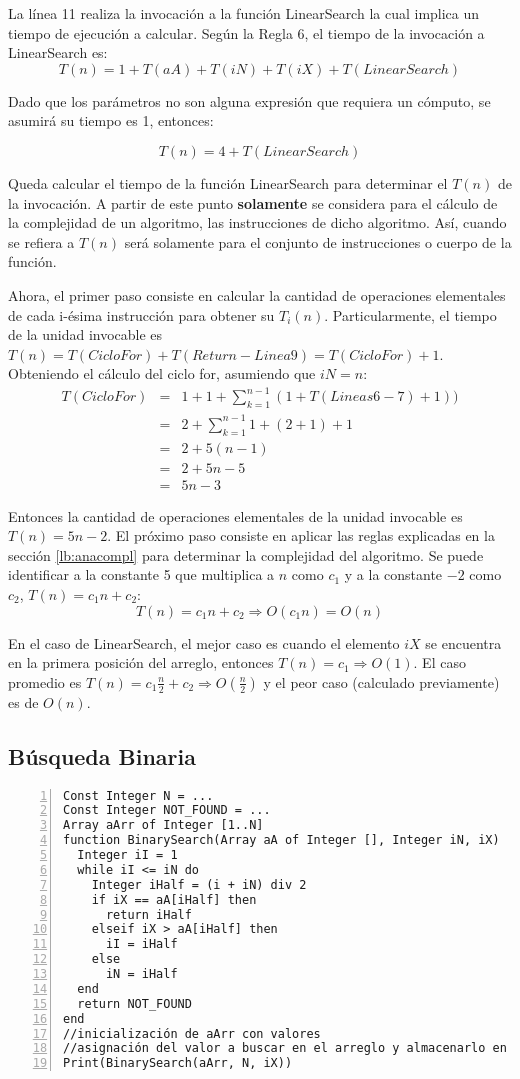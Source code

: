 La línea 11 realiza la invocación a la función LinearSearch la cual implica un tiempo de ejecución a calcular. Según la Regla 6, el tiempo de la invocación a LinearSearch es:
$$T(n) = 1 + T(aA) + T(iN) + T(iX) + T(LinearSearch)$$

Dado que los parámetros no son alguna expresión que requiera un cómputo, se asumirá su tiempo es 1, entonces:

$$T(n) = 4 + T(LinearSearch)$$

Queda calcular el tiempo de la función LinearSearch para determinar el $T(n)$ de la invocación. A partir de este punto \textbf{solamente} se considera para el cálculo de la complejidad de un algoritmo, las instrucciones de dicho algoritmo. Así, cuando se refiera a $T(n)$ será solamente para el conjunto de instrucciones o cuerpo de la función.

Ahora, el primer paso consiste en calcular la cantidad de operaciones elementales de cada i-ésima instrucción para obtener su $T_i(n)$. Particularmente, el tiempo de la unidad invocable es $T(n) = T(CicloFor) + T(Return-Linea9) = T(CicloFor) + 1$. Obteniendo el cálculo del ciclo for, asumiendo que $iN=n$:
\begin{eqnarray*}
T(CicloFor)&=&1 + 1 + \sum_{k=1}^{n - 1}{(1 + T(Lineas 6-7) + 1))}\\
&=&2 + \sum_{k=1}^{n - 1}{1 + (2 + 1) + 1}\\
&=&2 + 5(n - 1)\\
&=&2 + 5n - 5\\
&=&5n - 3
\end{eqnarray*}

Entonces la cantidad de operaciones elementales de la unidad invocable es $T(n) = 5n - 2$. El próximo paso consiste en aplicar las reglas explicadas en la sección \ref{lb:anacompl} para determinar la complejidad del algoritmo. Se puede identificar a la constante 5 que multiplica a $n$ como $c_1$ y a la constante $-2$ como $c_2$, $T(n) = c_1n + c_2$:
$$T(n) = c_1n + c_2 \Rightarrow O(c_1n) = O(n)$$

En el caso de LinearSearch, el mejor caso es cuando el elemento $iX$ se encuentra en la primera posición del arreglo, entonces $T(n) = c_1 \Rightarrow O(1)$. El caso promedio es $T(n) = c_1\frac{n}{2} + c_2 \Rightarrow O(\frac{n}{2})$ y el peor caso (calculado previamente) es de $O(n)$.

\subsection{Búsqueda Binaria}
\begin{lstlisting}[upquote=true, language=pseudo, numbers=left]
Const Integer N = ...
Const Integer NOT_FOUND = ...
Array aArr of Integer [1..N]
function BinarySearch(Array aA of Integer [], Integer iN, iX)	//iX es el elemento a buscar
  Integer iI = 1
  while iI <= iN do
    Integer iHalf = (i + iN) div 2
    if iX == aA[iHalf] then
      return iHalf
    elseif iX > aA[iHalf] then
      iI = iHalf
    else
      iN = iHalf
  end
  return NOT_FOUND
end
//inicialización de aArr con valores
//asignación del valor a buscar en el arreglo y almacenarlo en iX
Print(BinarySearch(aArr, N, iX))
\end{lstlisting}


